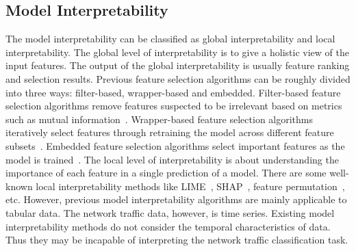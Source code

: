 \subsection{Model Interpretability}
The model interpretability can be classified as global interpretability and local interpretability.
The global level of interpretability is to give a holistic view of the input features. %
The output of the global interpretability is usually feature ranking and selection results. 
Previous feature selection algorithms can be roughly divided into three ways: filter-based, wrapper-based and embedded. 
Filter-based feature selection algorithms remove features suspected to be irrelevant based on metrics such as mutual information~\cite{kraskov2004estimating}. 
Wrapper-based feature selection algorithms iteratively select features through retraining the model across different feature subsets~\cite{guyon2002gene}. 
Embedded feature selection algorithms select important features as the model is trained~\cite{louppe2014understanding}.
The local level of interpretability is about understanding the importance of each feature in a single prediction of a model.
There are some well-known local interpretability methods like LIME~\cite{lime}, SHAP~\cite{shap}, feature permutation~\cite{altmann2010permutation}, etc.
However, previous model interpretability algorithms are mainly applicable to tabular data. 
The network traffic data, however, is time series. 
Existing model interpretability methods do not consider the temporal characteristics of data.
Thus they may be incapable of interpreting the network traffic classification task.